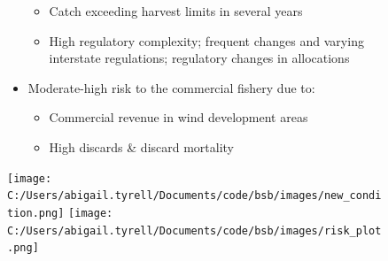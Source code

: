 \documentclass[
  10pt,
  letterpaper,
  DIV=11,
  numbers=noendperiod]{scrartcl}
\providecommand{\tightlist}{%
  \setlength{\itemsep}{0pt}\setlength{\parskip}{0pt}}\usepackage{longtable,booktabs,array}
\begin{document}
\begin{figure}
\begin{minipage}{0.57\linewidth}
\begin{itemize}
  \begin{itemize}
  \tightlist
  \item
    Catch exceeding harvest limits in several years
  \item
    High regulatory complexity; frequent changes and varying interstate
    regulations; regulatory changes in allocations
  \end{itemize}
\item
  Moderate-high risk to the commercial fishery due to:

  \begin{itemize}
  \tightlist
  \item
    Commercial revenue in wind development areas
  \item
    High discards \& discard mortality
  \end{itemize}
\end{itemize}

\end{minipage}%
%
\begin{minipage}{0.03\linewidth}

\hfill

\end{minipage}%
%
\begin{minipage}{0.40\linewidth}
\texttt{[image: C:/Users/abigail.tyrell/Documents/code/bsb/images/new\_condition.png]}
\texttt{[image: C:/Users/abigail.tyrell/Documents/code/bsb/images/risk\_plot.png]}\end{minipage}%

\end{figure}%

\newpage
\end{document}

